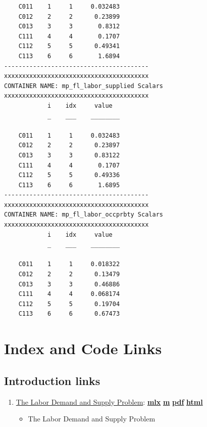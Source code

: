 \documentclass[
]{book}
\providecommand{\tightlist}{%
  \setlength{\itemsep}{0pt}\setlength{\parskip}{0pt}}
\begin{document}
\begin{verbatim}
    C011    1     1     0.032483
    C012    2     2      0.23899
    C013    3     3       0.8312
    C111    4     4       0.1707
    C112    5     5      0.49341
    C113    6     6       1.6894
----------------------------------------
xxxxxxxxxxxxxxxxxxxxxxxxxxxxxxxxxxxxxxxx
CONTAINER NAME: mp_fl_labor_supplied Scalars
xxxxxxxxxxxxxxxxxxxxxxxxxxxxxxxxxxxxxxxx
            i    idx     value  
            _    ___    ________

    C011    1     1     0.032483
    C012    2     2      0.23897
    C013    3     3      0.83122
    C111    4     4       0.1707
    C112    5     5      0.49336
    C113    6     6       1.6895
----------------------------------------
xxxxxxxxxxxxxxxxxxxxxxxxxxxxxxxxxxxxxxxx
CONTAINER NAME: mp_fl_labor_occprbty Scalars
xxxxxxxxxxxxxxxxxxxxxxxxxxxxxxxxxxxxxxxx
            i    idx     value  
            _    ___    ________

    C011    1     1     0.018322
    C012    2     2      0.13479
    C013    3     3      0.46886
    C111    4     4     0.068174
    C112    5     5      0.19704
    C113    6     6      0.67473
\end{verbatim}

\hypertarget{appendix-appendix}{%
\appendix}


\hypertarget{index-and-code-links}{%
\chapter{Index and Code Links}\label{index-and-code-links}}

\hypertarget{introduction-links}{%
\section{Introduction links}\label{introduction-links}}

\begin{enumerate}
\def\labelenumi{\arabic{enumi}.}
\tightlist
\item
  \href{https://fanwangecon.github.io/PrjLabEquiBFW/PrjLabEquiBFW/doc/intro/htmlpdfm/bfwx_intro.html}{The Labor Demand and Supply Problem}: \href{https://github.com/FanWangEcon/PrjLabEquiBFW/blob/master/PrjLabEquiBFW/doc/intro/bfwx_intro.mlx}{\textbf{mlx}} \textbar{} \href{https://github.com/FanWangEcon/PrjLabEquiBFW/blob/master/PrjLabEquiBFW/doc/intro/htmlpdfm/bfwx_intro.m}{\textbf{m}} \textbar{} \href{https://github.com/FanWangEcon/PrjLabEquiBFW/blob/master/PrjLabEquiBFW/doc/intro/htmlpdfm/bfwx_intro.pdf}{\textbf{pdf}} \textbar{} \href{https://fanwangecon.github.io/PrjLabEquiBFW/PrjLabEquiBFW/doc/intro/htmlpdfm/bfwx_intro.html}{\textbf{html}}

  \begin{itemize}
  \tightlist
  \item
    The Labor Demand and Supply Problem
  \end{itemize}
\end{enumerate}
\end{document}
